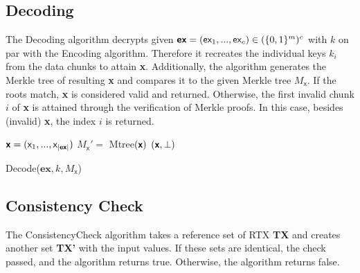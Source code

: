 \documentclass{cacthesis}
\begin{document}
        \subsection{Decoding}
        The \textsf{Decoding} algorithm decrypts given $\textsf{\textbf{ex}} = (\textsf{ex}_1, ..., \textsf{ex}_c) \in (\{0,1\}^m)^c$ with $k$ on par with the Encoding algorithm. Therefore it recreates the individual keys $k_i$ from the data chunks to attain \textsf{\textbf{x}}. Additionally, the algorithm generates the Merkle tree of resulting \textsf{\textbf{x}} and compares it to the given Merkle tree  $M_\textsf{x}$. If the roots match, \textsf{\textbf{x}} is considered valid and returned. Otherwise, the first invalid chunk $i$ of \textsf{\textbf{x}} is attained through the verification of Merkle proofs. In this case, besides (invalid) \textsf{\textbf{x}},  the index $i$ is returned.
        \begin{center}
        \begin{minipage}[t]{4in}
            \begin{algorithm}[H]
                 $\textsf{\textbf{x}} = (\textsf{x}_1,..., \textsf{x}_{|\textsf{\textbf{ex}}|})$\;
                 $M_\textsf{x}' = $ \textsf{Mtree}$(\textsf{\textbf{x}})$\;
                \Return $(\textsf{\textbf{x}}, \perp)$\;
                \caption{\textsf{Decode($\textbf{ex}, k, M_\textsf{x}$)}}
            \end{algorithm}
        \end{minipage}
        \end{center}
        
        \subsection{Consistency Check}
        The \textsf{ConsistencyCheck} algorithm takes a reference set of RTX \textbf{TX} and creates another set \textbf{TX'} with the input values. If these sets are identical, the check passed, and the algorithm returns \textsf{true}. Otherwise, the algorithm returns \textsf{false}.
        
\end{document}
